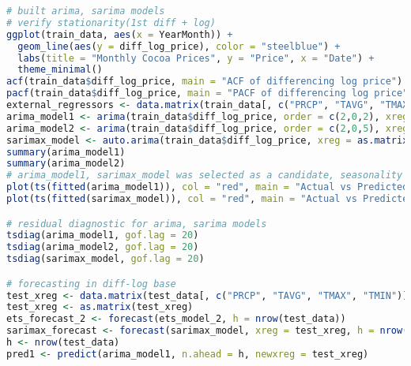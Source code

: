\documentclass[10pt]{article}
\begin{document}
\begin{lstlisting}[language=R, caption=ARIMA]
# built arima, sarima models
# verify stationarity(1st diff + log)
ggplot(train_data, aes(x = YearMonth)) +
  geom_line(aes(y = diff_log_price), color = "steelblue") +
  labs(title = "Monthly Cocoa Prices", y = "Price", x = "Date") +
  theme_minimal()
acf(train_data$diff_log_price, main = "ACF of differencing log price")
pacf(train_data$diff_log_price, main = "PACF of differencing log price")
external_regressors <- data.matrix(train_data[, c("PRCP", "TAVG", "TMAX", "TMIN")])
arima_model1 <- arima(train_data$diff_log_price, order = c(2,0,2), xreg = external_regressors)
arima_model2 <- arima(train_data$diff_log_price, order = c(2,0,5), xreg = external_regressors)
sarimax_model <- auto.arima(train_data$diff_log_price, xreg = as.matrix(external_regressors), seasonal = TRUE)
summary(arima_model1)
summary(arima_model2)
# arima_model1, sarimax_model was selected as a candidate, seasonality not detected(sarimaxmodel same as arimamodel1)
plot(ts(fitted(arima_model1)), col = "red", main = "Actual vs Predicted for diff-log price arima") + lines(ts(train_data$diff_log_price), col = "green")
plot(ts(fitted(sarimax_model)), col = "red", main = "Actual vs Predicted for diff-log price sarimax") + lines(ts(train_data$diff_log_price), col = "green")

# residual diagnostic for arima, sarima models
tsdiag(arima_model1, gof.lag = 20)
tsdiag(arima_model2, gof.lag = 20)
tsdiag(sarimax_model, gof.lag = 20)

# forecasting in diff-log base
test_xreg <- data.matrix(test_data[, c("PRCP", "TAVG", "TMAX", "TMIN")])
test_xreg <- as.matrix(test_xreg)
ets_forecast_2 <- forecast(ets_model_2, h = nrow(test_data))
sarimax_forecast <- forecast(sarimax_model, xreg = test_xreg, h = nrow(test_data))
h <- nrow(test_data)
pred1 <- predict(arima_model1, n.ahead = h, newxreg = test_xreg)
\end{lstlisting}
\end{document}
